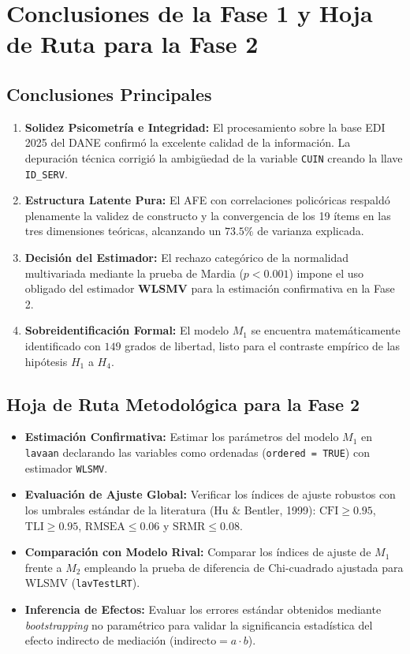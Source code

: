 \documentclass[11pt, a4paper]{article} %
\begin{document}
\section{Conclusiones de la Fase 1 y Hoja de Ruta para la Fase 2}

\subsection{Conclusiones Principales}

\begin{enumerate}[leftmargin=*, itemsep=2pt]
    \item \textbf{Solidez Psicometría e Integridad:} El procesamiento sobre la base EDI 2025 del DANE confirmó la excelente calidad de la información. La depuración técnica corrigió la ambigüedad de la variable \texttt{CUIN} creando la llave \texttt{ID\_SERV}.
    \item \textbf{Estructura Latente Pura:} El AFE con correlaciones policóricas respaldó plenamente la validez de constructo y la convergencia de los 19 ítems en las tres dimensiones teóricas, alcanzando un $73.5\%$ de varianza explicada.
    \item \textbf{Decisión del Estimador:} El rechazo categórico de la normalidad multivariada mediante la prueba de Mardia ($p < 0.001$) impone el uso obligado del estimador \textbf{WLSMV} para la estimación confirmativa en la Fase 2.
    \item \textbf{Sobreidentificación Formal:} El modelo $M_1$ se encuentra matemáticamente identificado con $149$ grados de libertad, listo para el contraste empírico de las hipótesis $H_1$ a $H_4$.
\end{enumerate}

\subsection{Hoja de Ruta Metodológica para la Fase 2}

\begin{itemize}[leftmargin=*, itemsep=2pt]
    \item \textbf{Estimación Confirmativa:} Estimar los parámetros del modelo $M_1$ en \texttt{lavaan} declarando las variables como ordenadas (\texttt{ordered = TRUE}) con estimador \texttt{WLSMV}.
    \item \textbf{Evaluación de Ajuste Global:} Verificar los índices de ajuste robustos con los umbrales estándar de la literatura (Hu \& Bentler, 1999): $\text{CFI} \ge 0.95$, $\text{TLI} \ge 0.95$, $\text{RMSEA} \le 0.06$ y $\text{SRMR} \le 0.08$.
    \item \textbf{Comparación con Modelo Rival:} Comparar los índices de ajuste de $M_1$ frente a $M_2$ empleando la prueba de diferencia de Chi-cuadrado ajustada para WLSMV (\texttt{lavTestLRT}).
    \item \textbf{Inferencia de Efectos:} Evaluar los errores estándar obtenidos mediante \textit{bootstrapping} no paramétrico para validar la significancia estadística del efecto indirecto de mediación ($\text{indirecto} = a \cdot b$).
\end{itemize}
\end{document}
